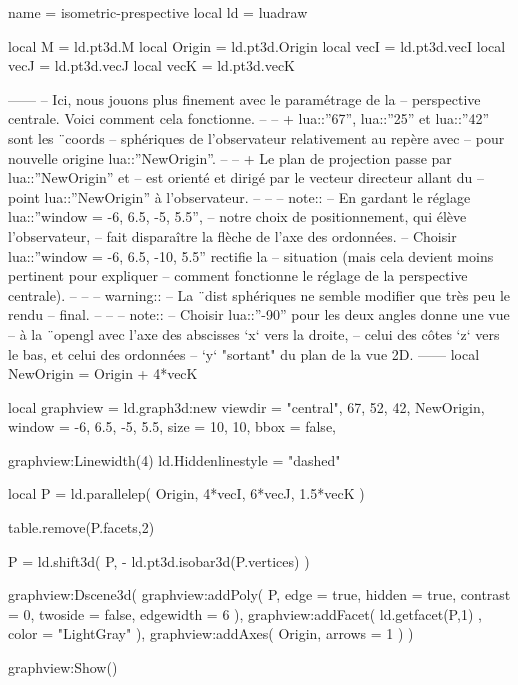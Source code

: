 \documentclass[border = 3pt]{standalone}
\begin{document}
\begin{luadraw*}{name = isometric-prespective}
local ld = luadraw

local M      = ld.pt3d.M
local Origin = ld.pt3d.Origin
local vecI   = ld.pt3d.vecI
local vecJ   = ld.pt3d.vecJ
local vecK   = ld.pt3d.vecK

------
-- Ici, nous jouons plus finement avec le paramétrage de la
-- perspective centrale. Voici comment cela fonctionne.
--
--     + lua::''67'', lua::''25'' et lua::''42'' sont les ¨coords
--     sphériques de l'observateur relativement au repère avec
--     pour nouvelle origine lua::''NewOrigin''.
--
--     + Le plan de projection passe par lua::''NewOrigin'' et
--     est orienté et dirigé par le vecteur directeur allant du
--     point lua::''NewOrigin'' à l'observateur.
--
--
-- note::
--     En gardant le réglage lua::''window = {-6, 6.5, -5, 5.5}'',
--     notre choix de positionnement, qui élève l'observateur,
--     fait disparaître la flèche de l'axe des ordonnées.
--     Choisir lua::''window  = {-6, 6.5, -10, 5.5}'' rectifie la
--     situation (mais cela devient moins pertinent pour expliquer
--     comment fonctionne le réglage de la perspective centrale).
--
--
-- warning::
--     La ¨dist sphériques ne semble modifier que très peu le rendu
--     final.
--
--
-- note::
--     Choisir lua::''-90'' pour les deux angles donne une vue
--     à la ¨opengl avec l'axe des abscisses `x` vers la droite,
--     celui des côtes `z` vers le bas, et celui des ordonnées
--     `y` "sortant" du plan de la vue 2D.
------
local NewOrigin = Origin + 4*vecK

local graphview = ld.graph3d:new{
  viewdir = {"central", 67, 52, 42, NewOrigin},
  window  = {-6, 6.5, -5, 5.5},
  size    = {10, 10},
  bbox    = false,
}

graphview:Linewidth(4)
ld.Hiddenlinestyle = "dashed"

local P = ld.parallelep(
  Origin,
  4*vecI, 6*vecJ, 1.5*vecK
)

table.remove(P.facets,2)

P = ld.shift3d(
  P,
  - ld.pt3d.isobar3d(P.vertices)
)

graphview:Dscene3d(
  graphview:addPoly(
    P,
    {
      edge      = true,
      hidden    = true,
      contrast  = 0,
      twoside   = false,
      edgewidth = 6
    }
  ),
  graphview:addFacet(
    ld.getfacet(P,1) ,
    {color = "LightGray"}
  ),
  graphview:addAxes(
    Origin,
    {arrows = 1}
  )
)

graphview:Show()
\end{luadraw*}
\end{document}
